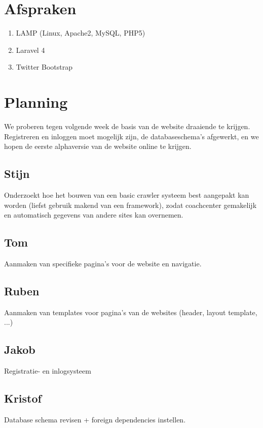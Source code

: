 \documentclass[11pt, a4paper]{article}
\begin{document}
\section{Afspraken}
\begin{enumerate}
\item LAMP (Linux, Apache2, MySQL, PHP5)
\item Laravel 4
\item Twitter Bootstrap
\end{enumerate}


\section{Planning}
We proberen tegen volgende week de basis van de website draaiende te krijgen. Registreren en inloggen moet mogelijk zijn, de databaseschema's afgewerkt, en we hopen de eerste alphaversie van de website online te krijgen.
\subsection{Stijn}
Onderzoekt hoe het bouwen van een basic crawler systeem best aangepakt kan
worden (liefst gebruik makend van een framework), zodat coachcenter gemakelijk
en automatisch gegevens van andere sites kan overnemen.
\subsection{Tom}
Aanmaken van specifieke pagina's voor de website en navigatie.
\subsection{Ruben}
Aanmaken van templates voor pagina's van de websites (header, layout template, ...)
\subsection{Jakob}
Registratie- en inlogsysteem
\subsection{Kristof}
Database schema revisen + foreign dependencies instellen.
\end{document}
